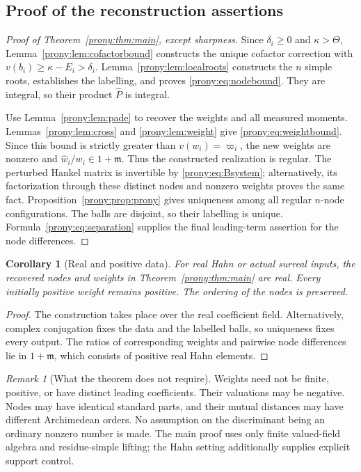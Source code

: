 \documentclass[11pt,letterpaper]{article}
\newtheorem{corollary}[theorem]{Corollary}
\theoremstyle{definition}
\theoremstyle{remark}
\newtheorem{remark}[theorem]{Remark}
\newcommand{\mfr}{\mathfrak m}
\newcommand{\Ph}{\widehat P}
\newcommand{\wh}{\widehat w}
\begin{document}
\subsection{Proof of the reconstruction assertions}
\begin{proof}[Proof of Theorem~\ref{prony:thm:main}, except sharpness]
Since $\delta_i\ge0$ and $\kappa>\Theta$, Lemma~\ref{prony:lem:cofactorbound}
constructs the unique cofactor correction with
$v(b_i)\ge\kappa-E_i>\delta_i$. Lemma~\ref{prony:lem:localroots} constructs the $n$
simple roots, establishes the labelling, and proves \eqref{prony:eq:nodebound}.
They are integral, so their product $\Ph$ is integral.

Use Lemma~\ref{prony:lem:pade} to recover the weights and all measured moments.
Lemmas~\ref{prony:lem:cross} and \ref{prony:lem:weight} give
\eqref{prony:eq:weightbound}. Since this bound is strictly greater than
$v(w_i)=\varpi_i$, the new weights are nonzero and
$\wh_i/w_i\in1+\mfr$. Thus the constructed realization is regular.
The perturbed Hankel matrix is invertible by \eqref{prony:eq:Bsystem}; alternatively,
its factorization through these distinct nodes and nonzero weights proves
the same fact. Proposition~\ref{prony:prop:prony} gives uniqueness among all
regular $n$-node configurations. The balls are disjoint, so their labelling
is unique. Formula~\eqref{prony:eq:separation} supplies the final leading-term
assertion for the node differences.
\end{proof}

\begin{corollary}[Real and positive data]\label{prony:cor:positive}
For real Hahn or actual surreal inputs, the recovered nodes and weights
in Theorem~\ref{prony:thm:main} are real. Every initially positive weight remains
positive. The ordering of the nodes is preserved.
\end{corollary}
\begin{proof}
The construction takes place over the real coefficient field. Alternatively,
complex conjugation fixes the data and the labelled balls, so uniqueness
fixes every output. The ratios of corresponding weights and pairwise node
differences lie in $1+\mfr$, which consists of positive real Hahn elements.
\end{proof}

\begin{remark}[What the theorem does not require]
Weights need not be finite, positive, or have distinct leading coefficients.
Their valuations may be negative. Nodes may have identical standard parts,
and their mutual distances may have different Archimedean orders. No
assumption on the discriminant being an ordinary nonzero number is made.
The main proof uses only finite valued-field algebra and residue-simple
lifting; the Hahn setting additionally supplies explicit support control.
\end{remark}
\end{document}
